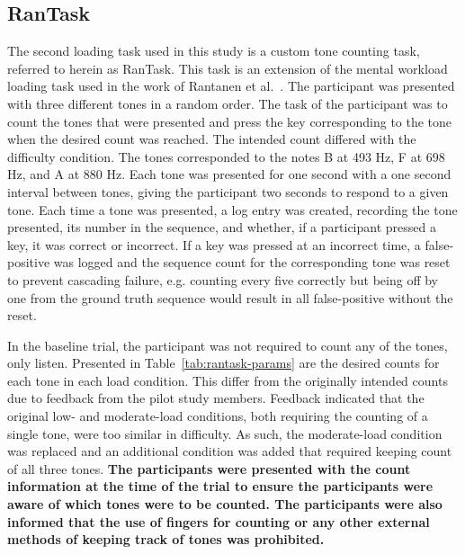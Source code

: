 \documentclass[11pt]{article}
\begin{document}
	\subsection{RanTask}
	The second loading task used in this study is a custom tone counting task, referred to herein as RanTask. This task is an extension of the mental workload loading task used in the work of Rantanen et al.~\cite{Rantanen}. The participant was presented with three different tones in a random order. The task of the participant was to count the tones that were presented and press the key corresponding to the tone when the desired count was reached. The intended count differed with the difficulty condition. The tones corresponded to the notes B at 493 Hz, F at 698 Hz, and A at 880 Hz. Each tone was presented for one second with a one second interval between tones, giving the participant two seconds to respond to a given tone. Each time a tone was presented, a log entry was created, recording the tone presented, its number in the sequence, and whether, if a participant pressed a key, it was correct or incorrect. If a key was pressed at an incorrect time, a false-positive was logged and the sequence count for the corresponding tone was reset to prevent cascading failure, e.g. counting every five correctly but being off by one from the ground truth sequence would result in all false-positive without the reset. 
	
	\begin{table}[]
	\centering
	\caption{Desired counts for each tone in each load condition.}
	\label{tab:rantask-params}
	\end{table}
	
	In the baseline trial, the participant was not required to count any of the tones, only listen. Presented in Table~\ref{tab:rantask-params} are the desired counts for each tone in each load condition. This differ from the originally intended counts due to feedback from the pilot study members. Feedback indicated that the original low- and moderate-load conditions, both requiring the counting of a single tone, were too similar in difficulty. As such, the moderate-load condition was replaced and an additional condition was added that required keeping count of all three tones. {\bf The participants were presented with the count information at the time of the trial to ensure the participants were aware of which tones were to be counted. The participants were also informed that the use of fingers for counting or any other external methods of keeping track of tones was prohibited. }
\end{document}
